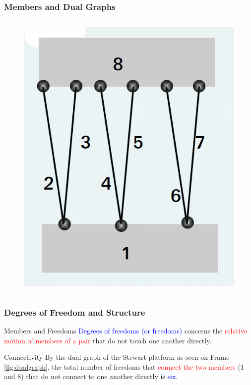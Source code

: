 	\begin{frame}
	\frametitle{Members and Dual Graphs}			
	\begin{tcolorbox}[colframe=blue!80!green, title=Dual graph of a Stewart platform, coltitle=white!80,toggle enlargement=none]
		\begin{columns}[b]
			\begin{column}{\linewidth}			
				\begin{figure}
					\centering 
					\includegraphics[width=.5\textwidth]{figures/dualgraph_stewart.jpg}
				\end{figure}
			\end{column}	
		\end{columns}
	\end{tcolorbox}
\label{fig:dualgraph}
\end{frame}

\begin{frame}
	\frametitle{Degrees of Freedom and Structure}
	\begin{block}{Members and Freedoms}
		\textcolor{blue}{Degrees of freedoms (or freedoms)} concerns the \textcolor{red}{relative motion of members of a pair} that do not touch one another directly. 
	\end{block}
	\begin{block}{Connectivity}
		By the dual graph of the Stewart platform as seen on Frame \autoref{fig:dualgraph}, the total number of freedoms that \textcolor{red}{connect the two members} (1 and 8) that do not connect to one another directly is \textcolor{blue}{six}. 
	\end{block}
\end{frame}


